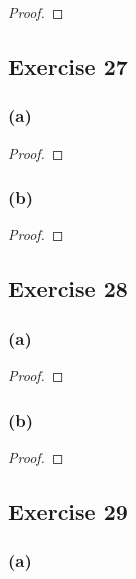\documentclass[14pt]{extarticle}
\begin{document}
\begin{proof}

\end{proof}

\subsection{Exercise 27}

\subsubsection{(a)}

\begin{proof}

\end{proof}

\subsubsection{(b)}

\begin{proof}

\end{proof}

\subsection{Exercise 28}

\subsubsection{(a)}

\begin{proof}

\end{proof}

\subsubsection{(b)}

\begin{proof}

\end{proof}

\subsection{Exercise 29}

\subsubsection{(a)}
\end{document}
